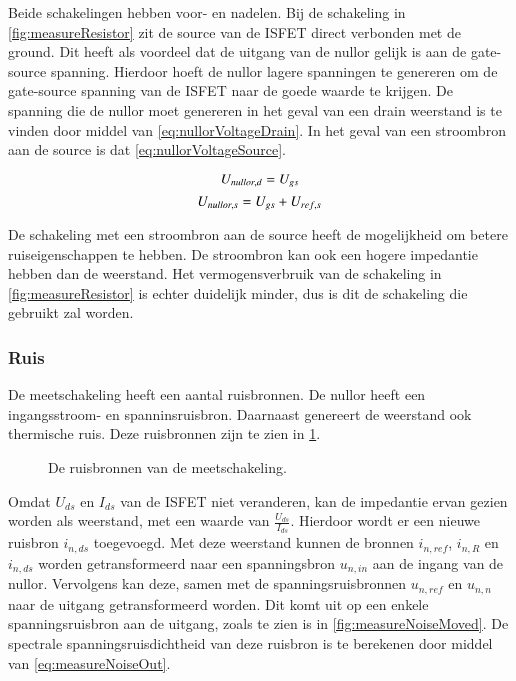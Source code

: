 Beide schakelingen hebben voor- en nadelen.
Bij de schakeling in \cref{fig:measureResistor} zit de source van de ISFET direct verbonden met de ground. Dit heeft als voordeel dat de uitgang van de nullor gelijk is aan de gate-source spanning. Hierdoor hoeft de nullor lagere spanningen te genereren om de gate-source spanning van de ISFET naar de goede waarde te krijgen. De spanning die de nullor moet genereren in het geval van een drain weerstand is te vinden door middel van \cref{eq:nullorVoltageDrain}. In het geval van een stroombron aan de source is dat \cref{eq:nullorVoltageSource}.

\begin{equation}\label{eq:nullorVoltageDrain}
    U_{nullor,d} = U_{gs}
    \tagaddtext{[\si{\volt}]}
\end{equation}
\begin{equation}\label{eq:nullorVoltageSource}
    U_{nullor,s} = U_{gs} + U_{ref,s}
    \tagaddtext{[\si{\volt}]}
\end{equation}

De schakeling met een stroombron aan de source heeft de mogelijkheid om betere ruiseigenschappen te hebben. De stroombron kan ook een hogere impedantie hebben dan de weerstand. Het vermogensverbruik van de schakeling in \cref{fig:measureResistor} is echter duidelijk minder, dus is dit de schakeling die gebruikt zal worden.

\subsubsection{Ruis}

De meetschakeling heeft een aantal ruisbronnen. De nullor heeft een ingangsstroom- en spanninsruisbron. Daarnaast genereert de weerstand ook thermische ruis. Deze ruisbronnen zijn te zien in \cref{fig:measureNoise}.
\begin{figure}[ht]
    \centering
    \def\svgwidth{0.6\textwidth}
    
    \caption{De ruisbronnen van de meetschakeling.}
    \label{fig:measureNoise}
\end{figure}


Omdat $U_{ds}$ en $I_{ds}$ van de ISFET niet veranderen, kan de impedantie ervan gezien worden als weerstand, met een waarde van $\frac{U_{ds}}{I_{ds}}$. Hierdoor wordt er een nieuwe ruisbron $i_{n,ds}$ toegevoegd. Met deze weerstand kunnen de bronnen $i_{n,ref}$, $i_{n,R}$ en $i_{n,ds}$ worden getransformeerd naar een spanningsbron $u_{n,in}$ aan de ingang van de nullor.
Vervolgens kan deze, samen met de spanningsruisbronnen $u_{n,ref}$ en $u_{n,n}$ naar de uitgang getransformeerd worden. Dit komt uit op een enkele spanningsruisbron aan de uitgang, zoals te zien is in \cref{fig:measureNoiseMoved}. De spectrale spanningsruisdichtheid van deze ruisbron is te berekenen door middel van \cref{eq:measureNoiseOut}.

